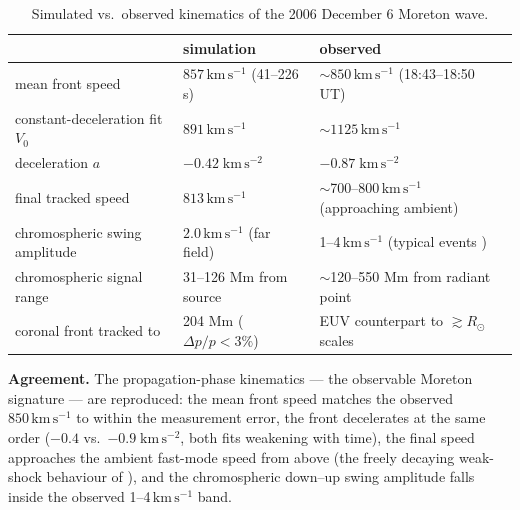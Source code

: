 \documentclass[11pt,a4paper]{article}
\newcommand{\kms}{\,\mathrm{km\,s^{-1}}}
\begin{document}
\begin{table}[h]\centering
\begin{tabular}{lll}
\toprule
 & simulation & observed \cite{Bala2010}\\
\midrule
mean front speed & $857\kms$ (41--226 s) & $\sim850\kms$ (18:43--18:50 UT)\\
constant-deceleration fit $V_0$ & $891\kms$ & $\sim1125\kms$\\
deceleration $a$ & $-0.42\;\mathrm{km\,s^{-2}}$ & $-0.87\;\mathrm{km\,s^{-2}}$\\
final tracked speed & $813\kms$ & $\sim$700--800$\kms$ (approaching ambient)\\
chromospheric swing amplitude & $2.0\kms$ (far field) & 1--4$\kms$ (typical events
\cite{Cabezas2019,Balasubramaniam2010})\\
chromospheric signal range & 31--126 Mm from source & $\sim$120--550 Mm from radiant point\\
coronal front tracked to & 204 Mm ($\Delta p/p<3\%$) & EUV counterpart to $\gtrsim R_\odot$ scales\\
\bottomrule
\end{tabular}
\caption{Simulated vs.\ observed kinematics of the 2006 December 6 Moreton wave.}
\end{table}

\noindent\textbf{Agreement.} The propagation-phase kinematics — the observable Moreton
signature — are reproduced: the mean front speed matches the observed $850\kms$ to within
the measurement error, the front decelerates at the same order ($-0.4$ vs.\
$-0.9\;\mathrm{km\,s^{-2}}$, both fits weakening with time), the final speed approaches
the ambient fast-mode speed from above (the freely decaying weak-shock behaviour of
\cite{Warmuth2004b,AU2011}), and the chromospheric down--up swing amplitude falls inside
the observed 1--4$\kms$ band.
\end{document}
